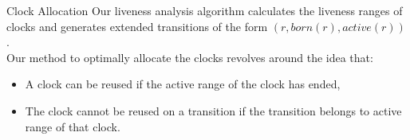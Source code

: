 \documentclass[10pt]{beamer}
\theoremstyle{plain}
\theoremstyle{definition}
\begin{document}
\begin{frame}{Clock Allocation}
	Our liveness analysis algorithm calculates the liveness ranges of clocks and generates extended transitions of the form $(r,born(r),active(r))$. \\
	\vspace{0.5cm}
	Our method to optimally allocate the clocks revolves around the idea that: 
	\begin{itemize}
		\item A clock can be reused if the active range of the clock has ended,
		\item The clock cannot be reused on a transition if the transition belongs to active range of that clock.
	\end{itemize}

\end{frame}
\end{document}
